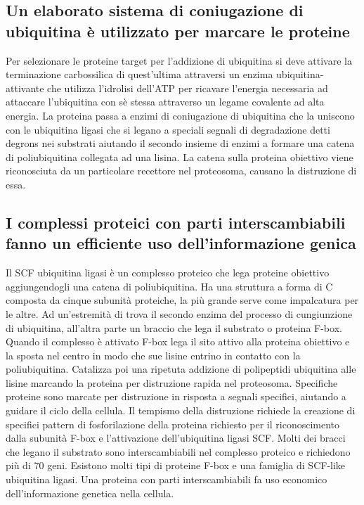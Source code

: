 \subsection{Un elaborato sistema di coniugazione di ubiquitina \`e utilizzato per marcare le proteine}
Per selezionare le proteine target per l'addizione di ubiquitina si deve attivare la terminazione carbossilica di quest'ultima attraversi un enzima ubiquitina-attivante che utilizza 
l'idrolisi dell'ATP per ricavare l'energia necessaria ad attaccare l'ubiquitina con s\`e stessa attraverso un legame covalente ad alta energia. La proteina passa a enzimi di coniugazione
di ubiquitina che la uniscono con le ubiquitina ligasi che si legano a speciali segnali di degradazione detti degrons nei substrati aiutando il secondo insieme di enzimi a formare una
catena di poliubiquitina collegata ad una lisina. La catena sulla proteina obiettivo viene riconosciuta da un particolare recettore nel proteosoma, causano la distruzione di essa. 
\subsection{I complessi proteici con parti interscambiabili fanno un efficiente uso dell'informazione genica}
Il SCF ubiquitina ligasi \`e un complesso proteico che lega proteine obiettivo aggiungendogli una catena di poliubiquitina. Ha una struttura a forma di C composta da cinque subunit\`a
proteiche, la pi\`u grande serve come impalcatura per le altre. Ad un'estremit\`a di trova il secondo enzima del processo di cungiunzione di ubiquitina, all'altra parte un braccio
che lega il substrato o proteina F-box. Quando il complesso \`e attivato F-box lega il sito attivo alla proteina obiettivo e la sposta nel centro in modo che sue lisine entrino in 
contatto con la poliubiquitina. Catalizza poi una ripetuta addizione di polipeptidi ubiquitina alle lisine marcando la proteina per distruzione rapida nel proteosoma.
Specifiche proteine sono marcate per distruzione in risposta a segnali specifici, aiutando a guidare il ciclo della cellula. Il tempismo della distruzione richiede la creazione di 
specifici pattern di fosforilazione della proteina richiesto per il riconoscimento dalla subunit\`a F-box e l'attivazione dell'ubiquitina ligasi SCF. Molti dei bracci che legano il 
substrato sono interscambiabili nel complesso proteico e richiedono pi\`u di $70$ geni. Esistono molti tipi di proteine F-box e una famiglia di SCF-like ubiquitina ligasi. Una proteina
con parti interscambiabili fa uso economico dell'informazione genetica nella cellula.

